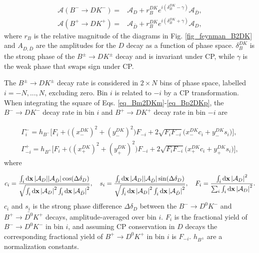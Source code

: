 \documentclass[12pt, a4paper, notitlepage, onecolumn]{article}
\numberwithin{equation}{section}
\begin{document}
\begin{align}
  \mathcal{A}(B^-\to DK^-) =& \mathcal{A}_D + r_B^{DK}e^{i(\delta_B^{DK} - \gamma)}\mathcal{A}_{\bar{D}}, \label{eq_Bm2DKm} \\
  \mathcal{A}(B^+\to DK^+) =& \mathcal{A}_{\bar{D}} + r_B^{DK}e^{i(\delta_B^{DK} + \gamma)}\mathcal{A}_D, \label{eq_Bp2DKp}
\end{align}
where $r_B$ is the relative magnitude of the diagrams in Fig. \ref{fig_feynman_B2DK} and $A_{D, \bar{D}}$ are the amplitudes for the $D$ decay as a function of phase space. $\delta_B^{DK}$ is the strong phase of the $B^\pm\to DK^\pm$ decay and is invariant under CP, while $\gamma$ is the weak phase that swaps sign under CP.

The $B^\pm\to DK^\pm$ decay rate is considered in $2\times N$ bins of phase space, labelled $i = -N, ..., N$, excluding zero. Bin $i$ is related to $-i$ by a CP transformation. When integrating the square of Eqs. \eqref{eq_Bm2DKm}-\eqref{eq_Bp2DKp}, the $B^-\to DK^-$ decay rate in bin $i$ and $B^+\to DK^+$ decay rate in bin $-i$ are

\begin{align}
  \Gamma^-_i = h_{B^-}\Big[F_i + \big((x_-^{DK})^2 + (y_-^{DK})^2\big)F_{-i} + 2\sqrt{F_iF_{-i}}\big(x_-^{DK}c_i + y_-^{DK}s_i\big)\Big], \label{eq_Bm2DKm_rate} \\
  \Gamma^+_{-i} = h_{B^+}\Big[F_i + \big((x_+^{DK})^2 + (y_+^{DK})^2\big)F_{-i} + 2\sqrt{F_iF_{-i}}\big(x_+^{DK}c_i + y_+^{DK}s_i\big)\Big], \label{eq_Bp2DKp_rate}
\end{align}
where

\begin{equation}
  c_i = \frac{\int_i\dd{\vb{x}}\abs{\mathcal{A}_D}\abs{\mathcal{A}_{\bar{D}}}\cos(\Delta\delta_D)}{\sqrt{\int_i\dd{\vb{x}}\abs{\mathcal{A}_D}^2\int_i\dd{\vb{x}}\abs{\mathcal{A}_{\bar{D}}}^2}}, \quad s_i = \frac{\int_i\dd{\vb{x}}\abs{\mathcal{A}_D}\abs{\mathcal{A}_{\bar{D}}}\sin(\Delta\delta_D)}{\sqrt{\int_i\dd{\vb{x}}\abs{\mathcal{A}_D}^2\int_i\dd{\vb{x}}\abs{\mathcal{A}_{\bar{D}}}^2}}, \quad F_i = \frac{\int_i\dd{\vb{x}}\abs{\mathcal{A}_D}^2}{\sum_i\int_i\dd{\vb{x}}\abs{\mathcal{A}_D}^2}.
  \label{eq_hadronic_parameters}
\end{equation}
$c_i$ and $s_i$ is the strong phase difference $\Delta\delta_D$ between the $B^-\to D^0K^-$ and $B^+\to\bar{D^0}K^+$ decays, amplitude-averaged over bin $i$. $F_i$ is the fractional yield of $B^-\to D^0K^-$ in bin $i$, and assuming CP conservation in $D$ decays the corresponding fractional yield of $B^+\to D^0K^+$ in bin $i$ is $F_{-i}$. $h_{B^\pm}$ are a normalization constants.
\end{document}
